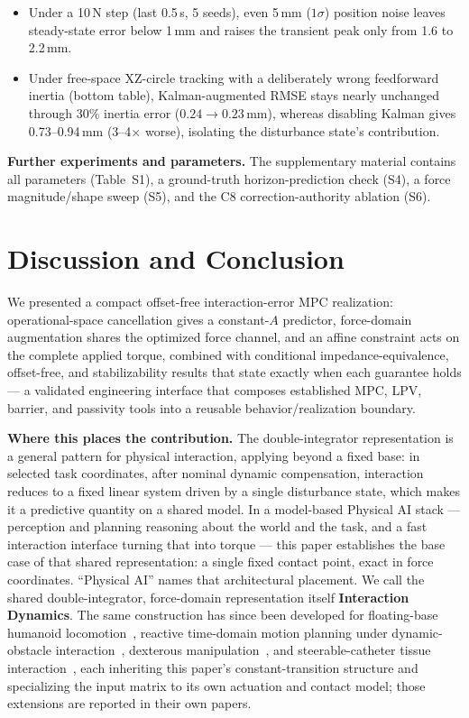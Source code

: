 \documentclass[journal]{IEEEtran}
\begin{document}
\begin{itemize}[leftmargin=*,itemsep=1pt,topsep=2pt]
\item Under a 10\,N step (last 0.5\,s, 5 seeds), even 5\,mm ($1\sigma$)
position noise leaves steady-state error below 1\,mm and raises the transient
peak only from 1.6 to 2.2\,mm.
\item Under free-space XZ-circle tracking with a deliberately wrong
feedforward inertia (bottom table), Kalman-augmented RMSE stays
nearly unchanged through 30\% inertia error ($0.24\to0.23$\,mm), whereas
disabling Kalman gives 0.73--0.94\,mm (3--4$\times$ worse), isolating the
disturbance state's contribution.
\end{itemize}

\textbf{Further experiments and parameters.} The supplementary material
contains all parameters (Table~S1), a ground-truth horizon-prediction check
(S4), a force magnitude/shape sweep (S5), and the C8 correction-authority
ablation (S6).

\section{Discussion and Conclusion}

We presented a compact offset-free interaction-error MPC realization:
operational-space cancellation gives a constant-$A$ predictor, force-domain
augmentation shares the optimized force channel, and an affine constraint acts
on the complete applied torque, combined with conditional impedance-equivalence,
offset-free, and stabilizability results that state exactly when each
guarantee holds --- a validated engineering interface that composes established
MPC, LPV, barrier, and passivity tools into a reusable behavior/realization
boundary.

\textbf{Where this places the contribution.} The double-integrator
representation is a general pattern for physical interaction, applying
beyond a fixed base: in selected task coordinates, after nominal
dynamic compensation, interaction reduces to a fixed linear system driven
by a single disturbance state, which makes it a predictive quantity on a
shared model. In a
model-based Physical AI stack --- perception and planning reasoning about
the world and the task, and a fast interaction interface turning that into
torque --- this paper establishes the base case of that shared
representation: a single fixed contact point, exact in force coordinates.
``Physical AI'' names that architectural placement.
We call the shared double-integrator, force-domain representation
itself \textbf{Interaction Dynamics}. The same construction has since been
developed for floating-base humanoid locomotion~\cite{caowbc}, reactive
time-domain motion planning under dynamic-obstacle interaction~\cite{caodriving},
dexterous manipulation~\cite{caodex}, and steerable-catheter tissue
interaction~\cite{caocath}, each inheriting this paper's constant-transition
structure and specializing the input matrix to its own actuation and contact
model; those extensions are reported in their own papers.
\end{document}
